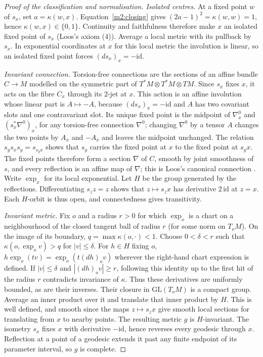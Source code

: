 \documentclass[11pt,reqno]{amsart}
\theoremstyle{definition}
\theoremstyle{remark}
\numberwithin{equation}{section}
\begin{document}
\begin{proof}[Proof of the classification and normalisation]
\emph{Isolated centres.}  At a fixed point $w$ of $s_x$, set $a=\kappa(w,x)$.  Equation~\eqref{m2:closing} gives $(2a-1)^2=\kappa(w,w)=1$,
hence $\kappa(w,x)\in\{0,1\}$.  Continuity and faithfulness therefore make $x$ an isolated fixed point of $s_x$ (Loos's axiom (4)).  Average
a local metric with its pullback by $s_x$.  In exponential coordinates at $x$ for this local metric the involution is linear, so an
isolated fixed point forces $(ds_x)_x=-\mathrm{id}$.

\emph{Invariant connection.}  Torsion-free connections are the sections of an affine bundle $C\to M$ modelled on the symmetric part of
$T^*M\otimes T^*M\otimes TM$.  Since $s_x$ fixes $x$, it acts on the fibre $C_x$ through its $2$-jet at $x$.  This action is an affine
involution whose linear part is $A\mapsto-A$, because $(ds_x)_x=-\mathrm{id}$ and $A$ has two covariant slots and one contravariant slot.
Its unique fixed point is the midpoint of $\nabla^0_x$ and $(s_x^*\nabla^0)_x$, for any torsion-free connection $\nabla^0$; changing
$\nabla^0$ by a tensor $A$ changes the two points by $A_x$ and $-A_x$ and leaves the midpoint unchanged.  The relation
$s_ys_xs_y=s_{s_yx}$ shows that $s_y$ carries the fixed point at $x$ to the fixed point at $s_yx$.  The fixed points therefore form a
section $\nabla$ of $C$, smooth by joint smoothness of $s$, and every reflection is an affine map of $\nabla$; this is Loos's canonical
connection \cite[Ch.~II, \S2]{Loos}.  Write $\exp_x$ for its local exponential.  Let $H$ be the group generated by the reflections.
Differentiating $s_zz=z$ shows that $z\mapsto s_zx$ has derivative $2\,\mathrm{id}$ at $z=x$.  Each $H$-orbit is thus open, and
connectedness gives transitivity.

\emph{Invariant metric.}  Fix $o$ and a radius $r>0$ for which $\exp_o$ is a chart on a neighbourhood of the closed tangent ball of
radius $r$ (for some norm on $T_oM$).  On the image of its boundary, $q=\max\kappa(o,\cdot)<1$.  Choose $0<\delta<r$ such that
$\kappa(o,\exp_ov)>q$ for $|v|\le\delta$.  For $h\in H$ fixing $o$, $h\exp_o(tv)=\exp_o(t(dh)_ov)$ wherever the right-hand chart
expression is defined.  If $|v|\le\delta$ and $|(dh)_ov|\ge r$, following this identity up to the first hit of the radius $r$ contradicts
invariance of $\kappa$.  Thus these derivatives are uniformly bounded, as are their inverses.  Their closure in $\mathrm{GL}(T_oM)$ is a
compact group.  Average an inner product over it and translate that inner product by $H$.  This is well defined, and smooth since the
maps $z\mapsto s_zx$ give smooth local sections for translating from $x$ to nearby points.  The resulting metric $g$ is $H$-invariant.
The isometry $s_x$ fixes $x$ with derivative $-\mathrm{id}$, hence reverses every geodesic through $x$.  Reflection at a point of a
geodesic extends it past any finite endpoint of its parameter interval, so $g$ is complete.


\end{proof}
\end{document}
